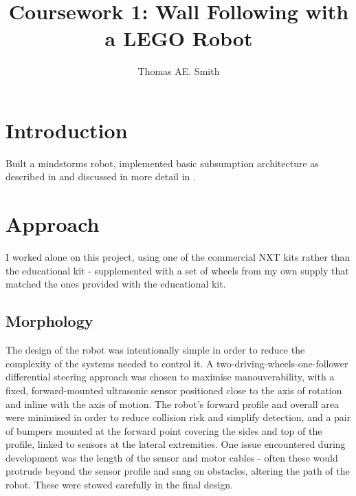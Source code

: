 \documentclass[a4paper,12pt]{article}
\title{Coursework 1:  Wall Following with a LEGO Robot}
\author{Thomas AE. Smith}
\begin{document}
\maketitle

\section{Introduction}


Built a mindstorms robot, implemented basic subsumption architecture as described in \citet{BrooksAIJ91} and discussed in more detail in \citet{brooks1986robust}.

\section{Approach}



I worked alone on this project, using one of the commercial NXT kits rather than the educational kit - supplemented with a set of wheels from my own supply that matched the ones provided with the educational kit.

\subsection{Morphology}
The design of the robot was intentionally simple in order to reduce the complexity of the systems needed to control it. A two-driving-wheels-one-follower differential steering approach was chosen to maximise manouverability, with a fixed, forward-mounted ultrasonic sensor positioned close to the axis of rotation and inline with the axis of motion. The robot's forward profile and overall area were minimised in order to reduce collision risk and simplify detection, and a pair of bumpers mounted at the forward point covering the sides and top of the profile, linked to sensors at the lateral extremities. One issue encountered during development was the length of the sensor and motor cables - often these would protrude beyond the sensor profile and snag on obstacles, altering the path of the robot. These were stowed carefully in the final design. 
\end{document}
